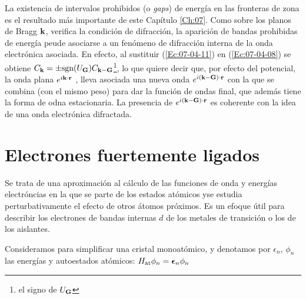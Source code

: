 La existencia de intervalos prohibidos (o \textit{gaps}) de energía en las fronteras de zona es el resultado más importante de este Capítulo \ref{Ch:07}. Como sobre los planos de Bragg $\mathbf{k}$, verifica la condición de difracción, la aparición de bandas prohibidas de energía peude asociarse a un fenómeno de difracción interna de la onda electrónica asociada. En efecto, al sustituir (\ref{Ec:07-04-11}) en (\ref{Ec:07-04-08}) se obtiene $C_{\mathbf{k}} = \pm \text{sgn}(U_{\mathbf{G}}) C_{\mathbf{k}-\mathbf{G}}$\footnote{el signo de $U_{\mathbf{G}}$}, lo que quiere decir que, por efecto del potencial, la onda plana $e^{i \mathbf{k} \cdot \mathbf{r}}$ , lleva asociada una nueva onda $e^{i(\mathbf{k} -\mathbf{G})\cdot \mathbf{r}}$ con la que se combina (con el mismo peso) para dar la función de ondas final, que además tiene la forma de odna estacionaria. La presencia de $e^{i(\mathbf{k} - \mathbf{G})\cdot \mathbf{r}}$ es coherente con la idea de una onda electrónica difractada. 

\section{Electrones fuertemente ligados}

Se trata de una aproximación al cálculo de las funciones de onda y energías electróncias en la que se parte de los estados atómicos yse estudia perturbativamente el efecto de otros átomos próximos. Es un efoque útil para describir los electrones de bandas internas $d$ de los metales de transición o los de los aislantes.

Consideramos para simplificar una cristal monoatómico, y denotamos por $\epsilon_n$, $\phi_n$ las energías y autoestados atómicos: $H_{\text{at}} \phi_n = \boldsymbol{\epsilon}_n \phi_n$

